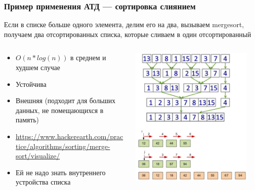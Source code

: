 \documentclass{../../slides-style}
\begin{document}
    \begin{frame}
        \frametitle{Пример применения АТД --- сортировка слиянием}
        Если в списке больше одного элемента, делим его на два, вызываем mergesort, получаем два отсортированных списка, которые сливаем в один отсортированный
        \begin{columns}
            \begin{column}{0.6\textwidth}
                \begin{itemize}
                    \item $O(n * log(n))$ в среднем и худшем случае
                    \item Устойчива
                    \item Внешняя (подходит для больших данных, не помещающихся в память)
                    \item \url{https://www.hackerearth.com/practice/algorithms/sorting/merge-sort/visualize/}
                    \item Ей не надо знать внутреннего устройства списка
                \end{itemize}
            \end{column}
            \begin{column}{0.4\textwidth}
                \begin{center}
                    \includegraphics[width=0.95\textwidth]{mergesort.png}
                \end{center}
            \end{column}
        \end{columns}
    \end{frame}
\end{document}
